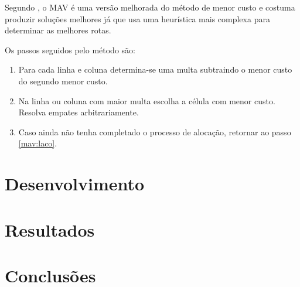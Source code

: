 \documentclass [11pt]{articleSBPO}
\begin{document}
Segundo \cite{TAHA}, o MAV é uma versão melhorada do método de menor custo e costuma produzir soluções melhores já que usa uma heurística mais complexa para determinar as melhores rotas.

Os passos seguidos pelo método são:

\begin{enumerate}
	\item Para cada linha e coluna determina-se uma multa subtraindo o menor custo do segundo menor custo. \label{mav:laco}
	\item Na linha ou coluna com maior multa escolha a célula com menor custo. Resolva empates arbitrariamente.
	\item Caso ainda não tenha completado o processo de alocação, retornar ao passo \ref{mav:laco}.
\end{enumerate}

\section{Desenvolvimento}\label{sec:desenvolvimento}


\section{Resultados}\label{sec:resultados}


\section{Conclusões}\label{sec:conclusao}




\end{document}
